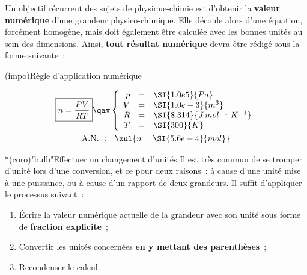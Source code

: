 \documentclass[../main/main.tex]{subfiles}
\begin{document}
Un objectif récurrent des sujets de physique-chimie est d'obtenir la
\textbf{valeur numérique} d'une grandeur physico-chimique. Elle découle alors
d'une équation, forcément homogène, mais doit également être calculée avec les
bonnes unités au sein des dimensions. Ainsi, \textbf{tout résultat numérique}
devra être rédigé sous la forme suivante~:
\begin{tcb}(impo){Règle d'application numérique}
	\vspace*{-10pt}
	\begin{minipage}{0.45\linewidth}
		\begin{gather*}
			\boxed{n = \frac{PV}{RT}}
			\qav
			\left\{
			\begin{array}{rcl}
				p & = & \SI{1.0e5}{Pa}                \\
				V & = & \SI{1.0e-3}{m^3}              \\
				R & = & \SI{8.314}{J.mol^{-1}.K^{-1}} \\
				T & = & \SI{300}{K}
			\end{array}
			\right.\\
			\mathrm{A.N.~:}\quad
			\xul{n = \SI{5.6e-4}{mol}}
		\end{gather*}
	\end{minipage}
	\hfill
\end{tcb}

\begin{tcb}*(coro)"bulb"{Effectuer un changement d'unités}
	Il est très commun de se tromper d'unité lors d'une conversion, et ce pour
	deux raisons~: à cause d'une unité mise à une puissance, ou à cause d'un
	rapport de deux grandeurs. Il suffit d'appliquer le processus suivant~:
	\begin{enumerate}
		\item Écrire la valeur numérique actuelle de la grandeur avec son unité sous
		      forme de \textbf{fraction explicite}~;
		\item Convertir les unités concernées \textbf{en y mettant des
			      parenthèses}~;
		\item Recondenser le calcul.
	\end{enumerate}
\end{tcb}
\end{document}

